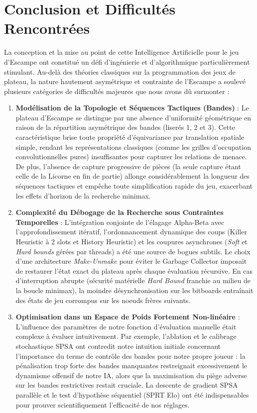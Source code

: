 \documentclass[12pt,a4paper]{article}
\begin{document}
\section{Conclusion et Difficultés Rencontrées}
La conception et la mise au point de cette Intelligence Artificielle pour le jeu d'Escampe ont constitué un défi d'ingénierie et d'algorithmique particulièrement stimulant. Au-delà des théories classiques sur la programmation des jeux de plateau, la nature hautement asymétrique et contrainte de l'Escampe a soulevé plusieurs catégories de difficultés majeures que nous avons dû surmonter :

\begin{enumerate}
    \item \textbf{Modélisation de la Topologie et Séquences Tactiques (Bandes)} : 
    Le plateau d'Escampe se distingue par une absence d'uniformité géométrique en raison de la répartition asymétrique des bandes (liserés 1, 2 et 3). Cette caractéristique brise toute propriété d'équivariance par translation spatiale simple, rendant les représentations classiques (comme les grilles d'occupation convolutionnelles pures) insuffisantes pour capturer les relations de menace. De plus, l'absence de capture progressive de pièces (la seule capture étant celle de la Licorne en fin de partie) allonge considérablement la longueur des séquences tactiques et empêche toute simplification rapide du jeu, exacerbant les effets d'horizon de la recherche minimax.
    
    \item \textbf{Complexité du Débogage de la Recherche sous Contraintes Temporelles} :
    L'intégration conjointe de l'élagage Alpha-Beta avec l'approfondissement itératif, l'ordonnancement dynamique des coups (Killer Heuristic à 2 slots et History Heuristic) et les coupures asynchrones (\textit{Soft} et \textit{Hard bounds} gérées par threads) a été une source de bogues subtils. Le choix d'une architecture \textit{Make-Unmake} pour éviter le Garbage Collector imposait de restaurer l'état exact du plateau après chaque évaluation récursive. En cas d'interruption abrupte (sécurité matérielle \textit{Hard Bound} franchie au milieu de la boucle minimax), la moindre désynchronisation sur les bitboards entraînait des états de jeu corrompus sur les noeuds frères suivants.
    
    \item \textbf{Optimisation dans un Espace de Poids Fortement Non-linéaire} :
    L'influence des paramètres de notre fonction d'évaluation manuelle était complexe à évaluer intuitivement. Par exemple, l'ablation et le calibrage stochastique SPSA ont contredit notre intuition initiale concernant l'importance du terme de contrôle des bandes pour notre propre joueur : la pénalisation trop forte des bandes manquantes restreignait excessivement le dynamisme offensif de notre IA, alors que la maximisation du piège adverse sur les bandes restrictives restait cruciale. La descente de gradient SPSA parallèle et le test d'hypothèse séquentiel (SPRT Elo) ont été indispensables pour prouver scientifiquement l'efficacité de nos réglages.
    

\end{enumerate}
\end{document}
